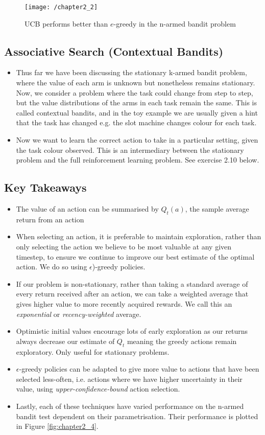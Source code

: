 \begin{figure}[h!]
	\centering
	\texttt{[image: /chapter2\_2]}
	\caption{UCB performs better than \(e\)-greedy in the n-armed bandit problem}
	\label{fig:chapter2_2}
\end{figure}

\subsection{Associative Search (Contextual Bandits)}
\begin{itemize}
\item Thus far we have been discussing the stationary k-armed bandit problem, where the value of each arm is unknown but nonetheless remains stationary. Now, we consider a problem where the task could change from step to step, but the value distributions of the arms in each task remain the same. This is called contextual bandits, and in the toy example we are usually given a hint that the task has changed e.g. the slot machine changes colour for each task.
\item Now we want to learn the correct action to take in a particular setting, given the task colour observed. This is an intermediary between the stationary problem and the full reinforcement learning problem. See exercise 2.10 below.
\end{itemize}

\subsection{Key Takeaways}
\begin{itemize}
\item The value of an action can be summarised by \(Q_t(a)\), the sample average return from an action
\item When selecting an action, it is preferable to maintain exploration, rather than only selecting the action we believe to be most valuable at any given timestep, to ensure we continue to improve our best estimate of the optimal action. We do so using \(\epsilon\))-greedy policies.
\item If our problem is non-stationary, rather than taking a standard average of every return received after an action, we can take a weighted average that gives higher value to more recently acquired rewards. We call this an \textit{exponential} or \textit{recency-weighted} average.
\item Optimistic initial values encourage lots of early exploration as our returns always decrease our estimate of \(Q_t\) meaning the greedy actions remain exploratory. Only useful for stationary problems.
\item \(\epsilon\)-greedy policies can be adapted to give more value to actions that have been selected less-often, i.e. actions where we have higher uncertainty in their value, using \textit{upper-confidence-bound} action selection.
\item Lastly, each of these techniques have varied performance on the n-armed bandit test dependent on their parametrisation. Their performance is plotted in Figure \ref{fig:chapter2_4}.
\end{itemize}

